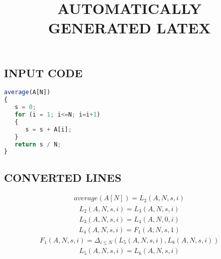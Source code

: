 \documentclass{article}
\begin{document}
\title{AUTOMATICALLY GENERATED LATEX}
\maketitle

\subsection{INPUT CODE}
\begin{lstlisting}[language=JavaScript]
average(A[N])
{
   s = 0;
   for (i = 1; i<=N; i=i+1)
   {
      s = s + A[i];
   }
   return s / N;
}

\end{lstlisting}

\subsection{CONVERTED LINES}
\begin{equation*}\begin{split}
average\left(A[N]\right) = L_{2}\left(A,N,s,i\right)
\end{split}\end{equation*}
\begin{equation*}\begin{split}
L_{2}\left(A,N,s,i\right) = L_{3}\left(A,N,s,i\right)
\end{split}\end{equation*}
\begin{equation*}\begin{split}
L_{3}\left(A,N,s,i\right) = L_{4}\left(A,N,0,i\right)
\end{split}\end{equation*}
\begin{equation*}\begin{split}
L_{4}\left(A,N,s,i\right) = F_{1}\left(A,N,s,1\right)
\end{split}\end{equation*}
\begin{equation*}\begin{split}
F_{1}\left(A,N,s,i\right) = \Delta_{i\leq N}\left(L_{5}\left(A,N,s,i\right),L_{8}\left(A,N,s,i\right)\right)
\end{split}\end{equation*}
\begin{equation*}\begin{split}
L_{5}\left(A,N,s,i\right) = L_{6}\left(A,N,s,i\right)
\end{split}\end{equation*}
\end{document}
